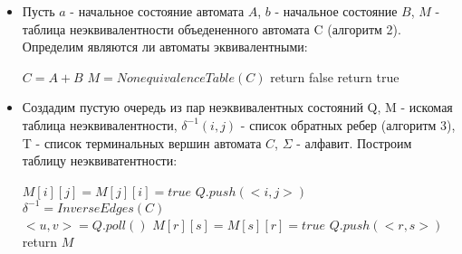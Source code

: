 \documentclass[12pt]{article}
\begin{document}
\begin{itemize}

\item Пусть $a$ - начальное состояние автомата $A$, $b$ - начальное состояние $B$, $M$ - таблица неэквивалентности объедененного автомата C (алгоритм 2). Определим являются ли автоматы эквивалентными:

\begin{algorithmic}[1]	
		\State $C=A+B$
		\State $M = NonequivalenceTable(C)$
			\State return false
		\Else 
			\State return true
		\EndIf			
	\EndProcedure
\end{algorithmic}	



\item Создадим пустую очередь из пар неэквивалентных состояний Q, M - искомая таблица неэквивалентности, $\delta^{-1}(i,j)$ - список обратных ребер (алгоритм 3), T - список терминальных вершин автомата $C$, $\Sigma$ - алфавит. Построим таблицу неэквиватентности:

\begin{algorithmic}[1]
					\State $M[i][j] = M[j][i] = true$
					\State $Q.push(<i,j>)$
				\EndIf
			\EndFor
		\EndFor\\
		\State $\delta^{-1} = InverseEdges(C)$\\
		
			\State $<u, v> = Q.poll()$
								\State $M[r][s] = M[s][r] = true$
								\State $Q.push(<r, s>)$
							\EndIf							
						\EndFor					
					\EndFor
				\EndFor
		\EndWhile\\
	\State return $M$
	\EndProcedure
\end{algorithmic}	




\end{itemize}
\end{document}
